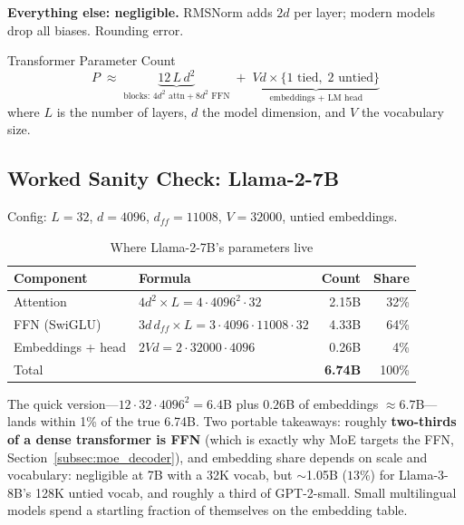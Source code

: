 \textbf{Everything else: negligible.} RMSNorm adds $2d$ per layer; modern models drop all biases. Rounding error.

\begin{mathresult}{Transformer Parameter Count}
\begin{equation}
P \;\approx\; \underbrace{12\, L\, d^2}_{\text{blocks: } 4d^2 \text{ attn} + 8d^2 \text{ FFN}} \;+\; \underbrace{V d \times \{1 \text{ tied},\; 2 \text{ untied}\}}_{\text{embeddings + LM head}}
\end{equation}
where $L$ is the number of layers, $d$ the model dimension, and $V$ the vocabulary size.
\end{mathresult}

\subsection{Worked Sanity Check: Llama-2-7B}

Config: $L = 32$, $d = 4096$, $d_{ff} = 11008$, $V = 32000$, untied embeddings.

\begin{table}[H]
\centering
\caption{Where Llama-2-7B's parameters live}
\begin{tabular}{llrr}
\toprule
\textbf{Component} & \textbf{Formula} & \textbf{Count} & \textbf{Share} \\
\midrule
Attention & $4d^2 \times L = 4 \cdot 4096^2 \cdot 32$ & 2.15B & 32\% \\
FFN (SwiGLU) & $3 d\, d_{ff} \times L = 3 \cdot 4096 \cdot 11008 \cdot 32$ & 4.33B & 64\% \\
Embeddings + head & $2 V d = 2 \cdot 32000 \cdot 4096$ & 0.26B & 4\% \\
\midrule
Total & & \textbf{6.74B} & 100\% \\
\bottomrule
\end{tabular}
\end{table}

The quick version---$12 \cdot 32 \cdot 4096^2 = 6.4$B plus $0.26$B of embeddings $\approx 6.7$B---lands within 1\% of the true 6.74B. Two portable takeaways: roughly \textbf{two-thirds of a dense transformer is FFN} (which is exactly why MoE targets the FFN, Section~\ref{subsec:moe_decoder}), and embedding share depends on scale and vocabulary: negligible at 7B with a 32K vocab, but $\sim$1.05B ($13\%$) for Llama-3-8B's 128K untied vocab, and roughly a third of GPT-2-small. Small multilingual models spend a startling fraction of themselves on the embedding table.

